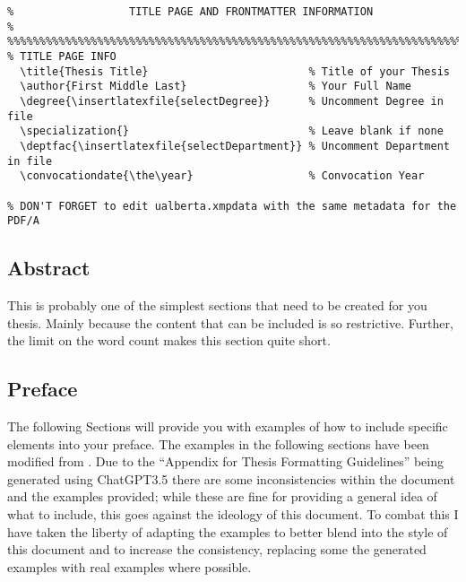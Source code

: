 			\begin{lstlisting}[float=ht,caption=Example of How to Set Title Page Info,label=lst:TitlePage,style=LaTeXStyle,basicstyle=\scriptsize\ttfamily,]
%%%%%%%%%%%%%%%%%%%%%%%%%%%%%%%%%%%%%%%%%%%%%%%%%%%%%%%%%%%%%%%%%%%%%%%%%%%%%%%%
%                  TITLE PAGE AND FRONTMATTER INFORMATION                      %
%%%%%%%%%%%%%%%%%%%%%%%%%%%%%%%%%%%%%%%%%%%%%%%%%%%%%%%%%%%%%%%%%%%%%%%%%%%%%%%%
% TITLE PAGE INFO
  \title{Thesis Title}                         % Title of your Thesis
  \author{First Middle Last}                   % Your Full Name
  \degree{\insertlatexfile{selectDegree}}      % Uncomment Degree in file
  \specialization{}                            % Leave blank if none
  \deptfac{\insertlatexfile{selectDepartment}} % Uncomment Department in file
  \convocationdate{\the\year}                  % Convocation Year

% DON'T FORGET to edit ualberta.xmpdata with the same metadata for the PDF/A
			\end{lstlisting}
			

		\subsection{Abstract}\label{abstract}
			This is probably one of the simplest sections that need to be created for you thesis.
			Mainly because the content that can be included is so restrictive.
			Further, the limit on the word count makes this section quite short.


		\subsection{Preface}\label{preface}
			The following Sections will provide you with examples of how to include specific elements into your preface.
			The examples in the following sections have been modified from .
			Due to the ``Appendix for Thesis Formatting Guidelines'' being generated using ChatGPT3.5 there are some inconsistencies within the document and the examples provided; while these are fine for providing a general idea of what to include, this goes against the ideology of this document.
			To combat this I have taken the liberty of adapting the examples to better blend into the style of this document and to increase the consistency, replacing some the generated examples with real examples where possible.

